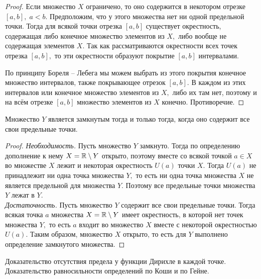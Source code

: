 \begin{proof}
    Если множество $X$ ограничено, то оно содержится
    в некотором отрезке $[a, b],\;a<b.$ Предположим,
    что у этого множества нет ни одной предельной точки.
    Тогда для всякой точки отрезка $[a, b]$ существует
    окрестность, содержащая либо конечное
    множество элементов из $X,$ либо
    вообще не содержащая элементов $X$.
    Так как рассматриваются
    окрестности всех точек отрезка $[a, b],$ то
    эти окрестности образуют покрытие $[a, b]$
    интервалами.

    По принципу Бореля -- Лебега мы можем выбрать
    из этого покрытия конечное множество интервалов,
    также покрывающее отрезок $[a, b].$ В каждом из
    этих интервалов или конечное множество элементов
    из $X,$ либо их там нет, поэтому и на всём
    отрезке $[a, b]$ множество элементов из $X$
    конечно. Противоречие.
\end{proof}

\begin{proposition}
    Множество $Y$ является замкнутым тогда
    и только тогда, когда оно содержит
    все свои предельные точки.
\end{proposition}
\begin{proof}
    \emph{Необходимость.} Пусть множество
    $Y$ замкнуто. Тогда по определению
    дополнение к нему $X=\mathbb{R}\setminus Y$
    открыто, поэтому вместе со всякой
    точкой $a\in X$ во множестве
    $X$ лежит и некоторая окрестность
    $U(a)$ точки $X.$ Тогда $U(a)$
    не принадлежит ни одна точка
    множества $Y,$ то есть ни одна
    точка множества $X$ не является
    предельной для множества $Y.$
    Поэтому все предельные точки
    множества $Y$ лежат в $Y.$\\
    \emph{Достаточность.} Пусть
    множество $Y$ содержит все свои
    предельные точки. Тогда
    всякая точка $a$ множества
    $X=\mathbb{R}\setminus Y$ имеет
    окрестность, в которой нет
    точек множества $Y,$ то есть
    $a$ входит во множество $X$
    вместе с некоторой окрестностью
    $U(a).$ Таким образом, множество
    $X$ открыто, то есть для $Y$
    выполнено определение замкнутого
    множества.
\end{proof}


\newpage
\begin{problem}
Доказательство отсутствия предела у функции Дирихле в каждой точке. Доказательство равносильности определений по Коши и по Гейне.
\end{problem}

